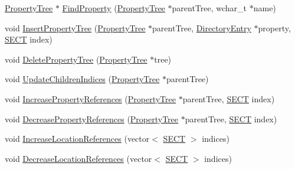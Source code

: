 \begin{DoxyCompactItemize}
\item 
\hyperlink{class_y_compound_files_1_1_compound_file_1_1_property_tree}{Property\+Tree} $\ast$ \hyperlink{class_y_compound_files_1_1_compound_file_a376cba46381ada6ef75ebaebe79e24ab}{Find\+Property} (\hyperlink{class_y_compound_files_1_1_compound_file_1_1_property_tree}{Property\+Tree} $\ast$parent\+Tree, wchar\+\_\+t $\ast$name)
\item 
void \hyperlink{class_y_compound_files_1_1_compound_file_a0106098f394b20eb07536b3898039ff2}{Insert\+Property\+Tree} (\hyperlink{class_y_compound_files_1_1_compound_file_1_1_property_tree}{Property\+Tree} $\ast$parent\+Tree, \hyperlink{class_y_compound_files_1_1_compound_file_1_1_directory_entry}{Directory\+Entry} $\ast$property, \hyperlink{_basic_excel_8hpp_a784c2e2144ab372c047faeeb0f6a9e6b}{S\+E\+C\+T} index)
\item 
void \hyperlink{class_y_compound_files_1_1_compound_file_ad37847867f946396bc545bab73f1066d}{Delete\+Property\+Tree} (\hyperlink{class_y_compound_files_1_1_compound_file_1_1_property_tree}{Property\+Tree} $\ast$tree)
\item 
void \hyperlink{class_y_compound_files_1_1_compound_file_a35140b5b01714e81a4393c73fcb22b2a}{Update\+Children\+Indices} (\hyperlink{class_y_compound_files_1_1_compound_file_1_1_property_tree}{Property\+Tree} $\ast$parent\+Tree)
\item 
void \hyperlink{class_y_compound_files_1_1_compound_file_a50ed04c43e1d286037509fa6adfe2865}{Increase\+Property\+References} (\hyperlink{class_y_compound_files_1_1_compound_file_1_1_property_tree}{Property\+Tree} $\ast$parent\+Tree, \hyperlink{_basic_excel_8hpp_a784c2e2144ab372c047faeeb0f6a9e6b}{S\+E\+C\+T} index)
\item 
void \hyperlink{class_y_compound_files_1_1_compound_file_ad41516e12f1d07dabc34ad5417380cf3}{Decrease\+Property\+References} (\hyperlink{class_y_compound_files_1_1_compound_file_1_1_property_tree}{Property\+Tree} $\ast$parent\+Tree, \hyperlink{_basic_excel_8hpp_a784c2e2144ab372c047faeeb0f6a9e6b}{S\+E\+C\+T} index)
\item 
void \hyperlink{class_y_compound_files_1_1_compound_file_a8f934ee505dddfce900b2a4310018183}{Increase\+Location\+References} (vector$<$ \hyperlink{_basic_excel_8hpp_a784c2e2144ab372c047faeeb0f6a9e6b}{S\+E\+C\+T} $>$ indices)
\item 
void \hyperlink{class_y_compound_files_1_1_compound_file_a0438368b927c0338bd659f49eb8987b9}{Decrease\+Location\+References} (vector$<$ \hyperlink{_basic_excel_8hpp_a784c2e2144ab372c047faeeb0f6a9e6b}{S\+E\+C\+T} $>$ indices)

\end{DoxyCompactItemize}
